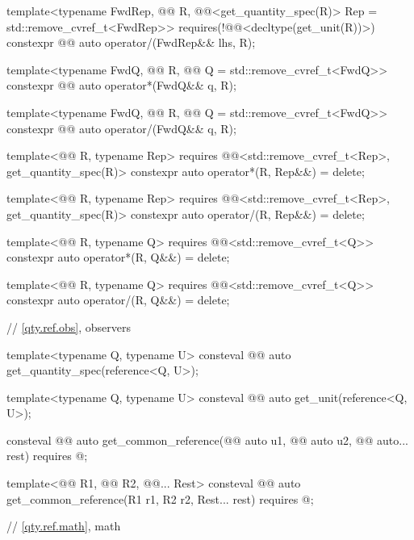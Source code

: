 \begin{codeblock}
{template<typename FwdRep, @@ R,
         @@<get_quantity_spec(R{})> Rep = std::remove_cvref_t<FwdRep>>
  requires(!@@<decltype(get_unit(R{}))>)
constexpr @@ auto operator/(FwdRep&& lhs, R);

template<typename FwdQ, @@ R, @@ Q = std::remove_cvref_t<FwdQ>>
constexpr @@ auto operator*(FwdQ&& q, R);

template<typename FwdQ, @@ R, @@ Q = std::remove_cvref_t<FwdQ>>
constexpr @@ auto operator/(FwdQ&& q, R);

template<@@ R, typename Rep>
  requires @@<std::remove_cvref_t<Rep>, get_quantity_spec(R{})>
constexpr auto operator*(R, Rep&&) = delete;

template<@@ R, typename Rep>
  requires @@<std::remove_cvref_t<Rep>, get_quantity_spec(R{})>
constexpr auto operator/(R, Rep&&) = delete;

template<@@ R, typename Q>
  requires @@<std::remove_cvref_t<Q>>
constexpr auto operator*(R, Q&&) = delete;

template<@@ R, typename Q>
  requires @@<std::remove_cvref_t<Q>>
constexpr auto operator/(R, Q&&) = delete;

// \ref{qty.ref.obs}, observers

template<typename Q, typename U>
consteval @@ auto get_quantity_spec(reference<Q, U>);

template<typename Q, typename U>
consteval @@ auto get_unit(reference<Q, U>);

consteval @@ auto get_common_reference(@@ auto u1,
                                                   @@ auto u2,
                                                   @@ auto... rest)
  requires @\seebelownc@;

template<@@ R1, @@ R2, @@... Rest>
consteval @@ auto get_common_reference(R1 r1, R2 r2, Rest... rest)
  requires @\seebelownc@;

// \ref{qty.ref.math}, math

}
\end{codeblock}
